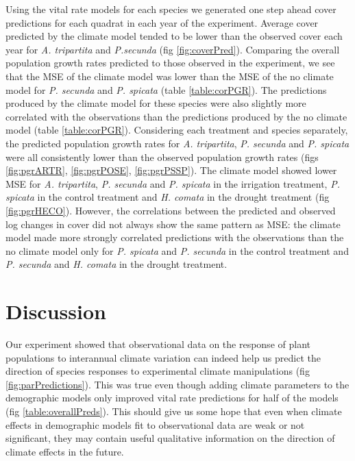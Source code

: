 \documentclass[11pt]{article}
\begin{document}
\begin{doublespacing}
Using the vital rate models for each species we generated one step ahead cover predictions for each quadrat in each year of the experiment.  Average cover predicted by the climate model tended to be lower than the observed cover each year for \textit{A. tripartita} and \textit{P.secunda} (fig \ref{fig:coverPred}). Comparing the overall population growth rates predicted to those observed in the experiment, we see that the MSE of the climate model was lower than the MSE of the no climate model for \textit{P. secunda} and \textit{P. spicata} (table \ref{table:corPGR}). The predictions produced by the climate model for these species were also slightly more correlated with the observations than the predictions produced by the no climate model (table \ref{table:corPGR}). Considering each treatment and species separately, the predicted population growth rates for \textit{A. tripartita}, \textit{P. secunda} and \textit{P. spicata} were all consistently lower than the observed population growth rates (figs \ref{fig:pgrARTR}, \ref{fig:pgrPOSE}, \ref{fig:pgrPSSP}). The climate model showed lower MSE for \textit{A. tripartita}, \textit{P. secunda} and \textit{P. spicata} in the irrigation treatment, \textit{P. spicata} in the control treatment and \textit{H. comata} in the drought treatment (fig \ref{fig:pgrHECO}).  However, the correlations between the predicted and observed log changes in cover did not always show the same pattern as MSE: the climate model made more strongly correlated predictions with the observations than the no climate model only for \textit{P. spicata} and \textit{P. secunda} in the control treatment and \textit{P. secunda} and \textit{H. comata} in the drought treatment. 
  

\section*{Discussion}

Our experiment showed that observational data on the response of plant populations to interannual climate variation can indeed help us predict the direction of species responses to experimental climate manipulations (fig \ref{fig:parPredictions}). This was true even though adding climate parameters to the demographic models only improved vital rate predictions for half of the models (fig \ref{table:overallPreds}). This should give us some hope that even when climate effects in demographic models fit to observational data are weak or not significant, they may contain useful qualitative information on the direction of climate effects in the future. 


\end{doublespacing}
\end{document}
